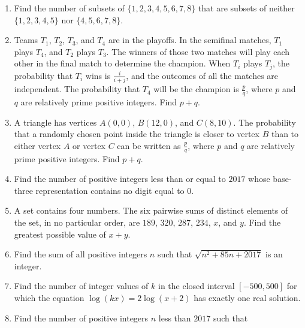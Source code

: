 \documentclass{article}
\begin{document}
\begin{enumerate}[label=\arabic*., itemsep=0.5em]\item Find the number of subsets of \(\{1, 2, 3, 4, 5, 6, 7, 8\}\) that are subsets of neither \(\{1, 2, 3, 4, 5\}\) nor \(\{4, 5, 6, 7, 8\}\).\par \vspace{0.5em}\item Teams \(T_1\), \(T_2\), \(T_3\), and \(T_4\) are in the playoffs. In the semifinal matches, \(T_1\) plays \(T_4\), and \(T_2\) plays \(T_3\). The winners of those two matches will play each other in the final match to determine the champion. When \(T_i\) plays \(T_j\), the probability that \(T_i\) wins is \(\frac{i}{i+j}\), and the outcomes of all the matches are independent. The probability that \(T_4\) will be the champion is \(\frac{p}{q}\), where \(p\) and \(q\) are relatively prime positive integers. Find \(p+q\).\par \vspace{0.5em}\item A triangle has vertices \(A(0,0)\), \(B(12,0)\), and \(C(8,10)\). The probability that a randomly chosen point inside the triangle is closer to vertex \(B\) than to either vertex \(A\) or vertex \(C\) can be written as \(\frac{p}{q}\), where \(p\) and \(q\) are relatively prime positive integers. Find \(p+q\).\par \vspace{0.5em}\item Find the number of positive integers less than or equal to \(2017\) whose base-three representation contains no digit equal to \(0\).\par \vspace{0.5em}\item A set contains four numbers. The six pairwise sums of distinct elements of the set, in no particular order, are \(189\), \(320\), \(287\), \(234\), \(x\), and \(y\). Find the greatest possible value of \(x+y\).\par \vspace{0.5em}\item Find the sum of all positive integers \(n\) such that \(\sqrt{n^2+85n+2017}\) is an integer.\par \vspace{0.5em}\item Find the number of integer values of \(k\) in the closed interval \([-500,500]\) for which the equation \(\log(kx)=2\log(x+2)\) has exactly one real solution.\par \vspace{0.5em}\item Find the number of positive integers \(n\) less than \(2017\) such that 

\end{enumerate}
\end{document}
